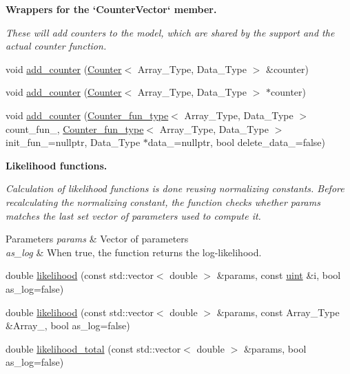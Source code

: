 \begin{Indent}\textbf{ Wrappers for the `\+Counter\+Vector` member.}\par
{\em These will add counters to the model, which are shared by the support and the actual counter function. }\begin{DoxyCompactItemize}
\item 
void \hyperlink{class_model_a1ed91acc6c747eabc8a83726c0ec7de5}{add\+\_\+counter} (\hyperlink{class_counter}{Counter}$<$ Array\+\_\+\+Type, Data\+\_\+\+Type $>$ \&counter)
\item 
void \hyperlink{class_model_a05265a5a9a12109a4a2b56b3bb42015e}{add\+\_\+counter} (\hyperlink{class_counter}{Counter}$<$ Array\+\_\+\+Type, Data\+\_\+\+Type $>$ $\ast$counter)
\item 
void \hyperlink{class_model_a950b0429e07047d4774eac60f7c335f2}{add\+\_\+counter} (\hyperlink{typedefs_8hpp_ac0160f52f564dea3ac033b374cffbfe7}{Counter\+\_\+fun\+\_\+type}$<$ Array\+\_\+\+Type, Data\+\_\+\+Type $>$ count\+\_\+fun\+\_\+, \hyperlink{typedefs_8hpp_ac0160f52f564dea3ac033b374cffbfe7}{Counter\+\_\+fun\+\_\+type}$<$ Array\+\_\+\+Type, Data\+\_\+\+Type $>$ init\+\_\+fun\+\_\+=nullptr, Data\+\_\+\+Type $\ast$data\+\_\+=nullptr, bool delete\+\_\+data\+\_\+=false)
\end{DoxyCompactItemize}
\end{Indent}
\begin{Indent}\textbf{ Likelihood functions.}\par
{\em Calculation of likelihood functions is done reusing normalizing constants. Before recalculating the normalizing constant, the function checks whether {\ttfamily params} matches the last set vector of parameters used to compute it.


\begin{DoxyParams}{Parameters}
{\em params} & Vector of parameters \\
\hline
{\em as\+\_\+log} & When {\ttfamily true}, the function returns the log-\/likelihood. \\
\hline
\end{DoxyParams}
}\begin{DoxyCompactItemize}
\item 
double \hyperlink{class_model_abc2f255c6b6c4dd0ff3680aab35fd308}{likelihood} (const std\+::vector$<$ double $>$ \&params, const \hyperlink{typedefs_8hpp_a91ad9478d81a7aaf2593e8d9c3d06a14}{uint} \&i, bool as\+\_\+log=false)
\item 
double \hyperlink{class_model_adf2c30d9c5ffdc87af6813d110146968}{likelihood} (const std\+::vector$<$ double $>$ \&params, const Array\+\_\+\+Type \&Array\+\_\+, bool as\+\_\+log=false)
\item 
double \hyperlink{class_model_a2fe9cf412c5b2323c35c18952f9cb09d}{likelihood\+\_\+total} (const std\+::vector$<$ double $>$ \&params, bool as\+\_\+log=false)
\end{DoxyCompactItemize}
\end{Indent}
